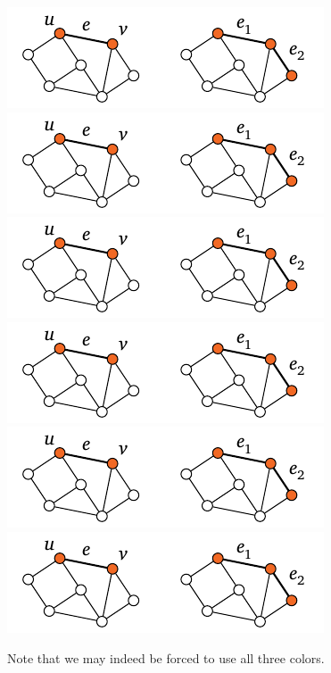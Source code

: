 \begin{center}
    \includegraphics[page=\PIntroIdC]{figs.pdf}\\
    \includegraphics[page=\PIntroIdCC]{figs.pdf}\\
    \includegraphics[page=\PIntroIdD]{figs.pdf}\\
    \includegraphics[page=\PIntroIdDD]{figs.pdf}\\
    \includegraphics[page=\PIntroIdE]{figs.pdf}\\
    \includegraphics[page=\PIntroIdEE]{figs.pdf}
\end{center}
Note that we may indeed be forced to use all three colors.


